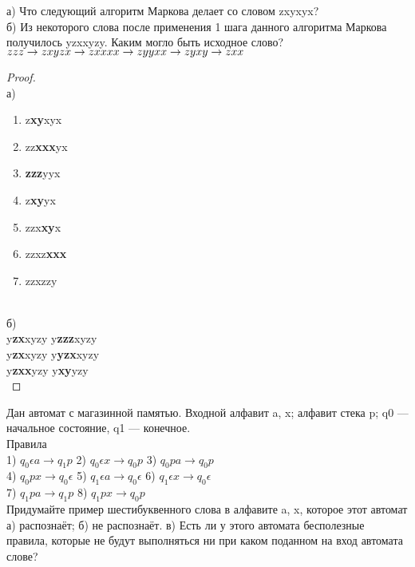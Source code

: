 \begin{problem}
    а) Что следующий алгоритм Маркова делает со словом zxyxyx? \\
    б) Из некоторого слова после применения 1 шага данного алгоритма Маркова получилось yzxxyzy. Каким могло быть исходное слово? \\
    $zzz \rightarrow zx \\
     yzx \rightarrow zx \\
     xxx \rightarrow zy \\
     yxx \rightarrow zy \\ 
     xy \rightarrow zxx$
\end{problem}

\begin{proof} $ $\\
    а) \begin{enumerate}
        \item z\textbf{xy}xyx
        \item zz\textbf{xxx}yx
        \item\textbf{zzz}yyx 
        \item z\textbf{xy}yx
        \item zzx\textbf{xy}x
        \item zzxz\textbf{xxx}
        \item zzxzzy
    \end{enumerate} \\
    б) \\
    y\textbf{zx}xyzy \leftarrow y\textbf{zzz}xyzy \\
    y\textbf{zx}xyzy \leftarrow y\textbf{yzx}xyzy \\
    y\textbf{zxx}yzy \leftarrow y\textbf{xy}yzy \\
    
\end{proof}

\begin{problem}
    Дан автомат с магазинной памятью. Входной алфавит {a, x}; алфавит стека {p}; q0 — начальное состояние, q1 — конечное.\\
    Правила\\
    1) $q_0 \epsilon a \rightarrow q_1 p$  2) $q_0 \epsilon x \rightarrow q_0 p$  3) $q_0 pa \rightarrow q_0 p$\\
    4) $q_0 px \rightarrow q_0 \epsilon$  5) $q_1 \epsilon a \rightarrow q_0 \epsilon$  6) $q_1 \epsilon x \rightarrow q_0 \epsilon$\\
    7) $q_1 pa \rightarrow q_1 p$  8) $q_1 px \rightarrow q_0 p$\\
    Придумайте пример шестибуквенного слова в алфавите {a, x}, которое этот автомат а) распознаёт; б) не распознаёт. в) Есть ли у этого автомата бесполезные правила, которые не будут выполняться ни при каком поданном на вход автомата слове?

\end{problem}

